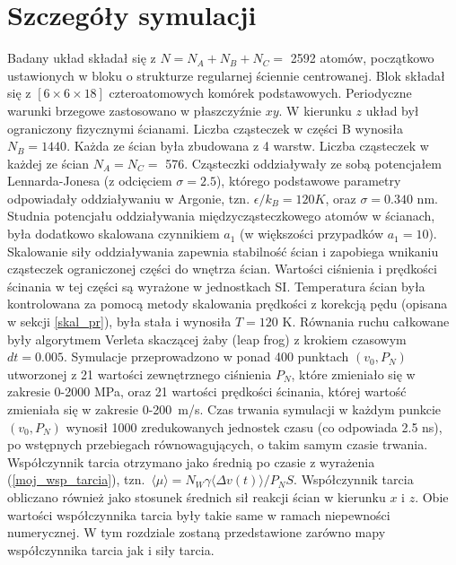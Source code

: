 \documentclass[12pt,a4paper,openright]{report} %
\begin{document}
\section{Szczegóły symulacji}
%
Badany układ składał się z $N=N_A + N_B + N_C =$ 2592 atomów, początkowo ustawionych w bloku o strukturze regularnej ściennie centrowanej. Blok składał się z $[6 \times 6 \times 18]$ czteroatomowych komórek podstawowych. Periodyczne warunki brzegowe zastosowano w płaszczyźnie $xy$. W kierunku $z$ układ był ograniczony fizycznymi ścianami. Liczba cząsteczek w części B wynosiła $N_B = 1440$. Każda ze ścian była zbudowana z 4 warstw. Liczba cząsteczek w każdej ze ścian $N_A = N_C =$ 576. Cząsteczki oddziaływały ze sobą potencjałem Lennarda-Jonesa (z odcięciem $\sigma=2.5$), którego podstawowe parametry odpowiadały oddziaływaniu w Argonie, tzn. $\epsilon / k_B = 120 K$, oraz $\sigma = 0.340$ nm. Studnia potencjału oddziaływania międzycząsteczkowego atomów w ścianach, była dodatkowo skalowana czynnikiem $a_1$ (w większości przypadków $a_1=10$). Skalowanie siły oddziaływania zapewnia stabilność ścian i zapobiega wnikaniu cząsteczek ograniczonej części do wnętrza ścian. Wartości ciśnienia i prędkości ścinania w tej części są wyrażone w jednostkach SI. Temperatura ścian była kontrolowana za pomocą metody skalowania prędkości z korekcją pędu (opisana w sekcji \ref{skal_pr}), była stała i wynosiła $T=120$ K. Równania ruchu całkowane były algorytmem Verleta skaczącej żaby (leap frog) z krokiem czasowym $dt = 0.005$. Symulacje przeprowadzono w ponad 400 punktach $(v_0, P_N)$ utworzonej z 21 wartości zewnętrznego ciśnienia $P_N$, które zmieniało się w zakresie 0-2000 MPa, oraz 21 wartości prędkości ścinania, której wartość zmieniała się w zakresie 0-200~m/s. Czas trwania symulacji w każdym punkcie $(v_0, P_N)$ wynosił 1000 zredukowanych jednostek czasu (co odpowiada 2.5 ns), po wstępnych przebiegach równowagujących, o takim samym czasie trwania. Współczynnik tarcia otrzymano jako średnią po czasie z wyrażenia (\ref{moj_wsp_tarcia}), tzn.~$\langle \mu \rangle = N_W \gamma \langle \Delta v(t) \rangle / P_N S$. Współczynnik tarcia obliczano również jako stosunek średnich sił reakcji ścian w kierunku $x$ i $z$. Obie wartości współczynnika tarcia były takie same w ramach niepewności numerycznej. W tym rozdziale zostaną przedstawione zarówno mapy współczynnika tarcia jak i siły tarcia.
%
%
\end{document}
